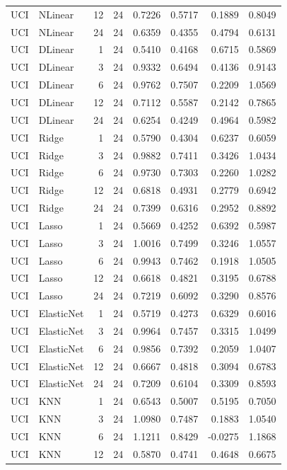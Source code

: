 \begin{tabular}{llrrrrrr}
UCI & NLinear & 12 & 24 & 0.7226 & 0.5717 & 0.1889 & 0.8049 \\
UCI & NLinear & 24 & 24 & 0.6359 & 0.4355 & 0.4794 & 0.6131 \\
UCI & DLinear & 1 & 24 & 0.5410 & 0.4168 & 0.6715 & 0.5869 \\
UCI & DLinear & 3 & 24 & 0.9332 & 0.6494 & 0.4136 & 0.9143 \\
UCI & DLinear & 6 & 24 & 0.9762 & 0.7507 & 0.2209 & 1.0569 \\
UCI & DLinear & 12 & 24 & 0.7112 & 0.5587 & 0.2142 & 0.7865 \\
UCI & DLinear & 24 & 24 & 0.6254 & 0.4249 & 0.4964 & 0.5982 \\
UCI & Ridge & 1 & 24 & 0.5790 & 0.4304 & 0.6237 & 0.6059 \\
UCI & Ridge & 3 & 24 & 0.9882 & 0.7411 & 0.3426 & 1.0434 \\
UCI & Ridge & 6 & 24 & 0.9730 & 0.7303 & 0.2260 & 1.0282 \\
UCI & Ridge & 12 & 24 & 0.6818 & 0.4931 & 0.2779 & 0.6942 \\
UCI & Ridge & 24 & 24 & 0.7399 & 0.6316 & 0.2952 & 0.8892 \\
UCI & Lasso & 1 & 24 & 0.5669 & 0.4252 & 0.6392 & 0.5987 \\
UCI & Lasso & 3 & 24 & 1.0016 & 0.7499 & 0.3246 & 1.0557 \\
UCI & Lasso & 6 & 24 & 0.9943 & 0.7462 & 0.1918 & 1.0505 \\
UCI & Lasso & 12 & 24 & 0.6618 & 0.4821 & 0.3195 & 0.6788 \\
UCI & Lasso & 24 & 24 & 0.7219 & 0.6092 & 0.3290 & 0.8576 \\
UCI & ElasticNet & 1 & 24 & 0.5719 & 0.4273 & 0.6329 & 0.6016 \\
UCI & ElasticNet & 3 & 24 & 0.9964 & 0.7457 & 0.3315 & 1.0499 \\
UCI & ElasticNet & 6 & 24 & 0.9856 & 0.7392 & 0.2059 & 1.0407 \\
UCI & ElasticNet & 12 & 24 & 0.6667 & 0.4818 & 0.3094 & 0.6783 \\
UCI & ElasticNet & 24 & 24 & 0.7209 & 0.6104 & 0.3309 & 0.8593 \\
UCI & KNN & 1 & 24 & 0.6543 & 0.5007 & 0.5195 & 0.7050 \\
UCI & KNN & 3 & 24 & 1.0980 & 0.7487 & 0.1883 & 1.0540 \\
UCI & KNN & 6 & 24 & 1.1211 & 0.8429 & -0.0275 & 1.1868 \\
UCI & KNN & 12 & 24 & 0.5870 & 0.4741 & 0.4648 & 0.6675 \\

\end{tabular}
